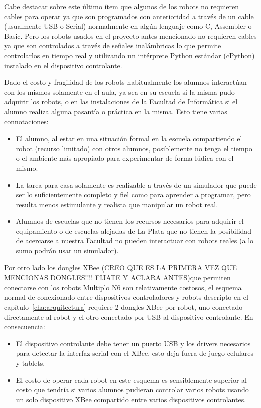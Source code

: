 Cabe destacar sobre este último ítem que algunos de los robots no requieren
cables para operar ya que son programados con anterioridad a través de un
cable (usualmente USB o Serial) normalmente en algún lenguaje como C, Assembler
o Basic. Pero los robots usados en el proyecto antes mencionado no requieren
cables ya que son controlados a través de señales
inalámbricas lo que permite controlarlos en tiempo real y utilizando
un intérprete Python estándar (cPython) instalado en el dispositivo
controlante.

Dado el costo y fragilidad de los robots habitualmente los alumnos interactúan
con los mismos solamente en el aula, ya sea en su escuela si la misma pudo
adquirir los robots, o en las instalaciones de la  Facultad de Informática si el alumno
realiza alguna pasantía o práctica en la misma. Esto tiene varias connotaciones:
\begin{itemize}
    \item El alumno, al estar en una situación formal en la escuela
        compartiendo el robot (recurso limitado) con otros
        alumnos, posiblemente no tenga el tiempo o el ambiente más apropiado
        para experimentar de forma lúdica con el mismo.
    \item La tarea para casa solamente es realizable a través de un simulador
        que puede ser lo suficientemente completo y fiel como para aprender
        a programar, pero resulta menos estimulante y realista que manipular
        un robot real.
    \item Alumnos de escuelas que no tienen los recursos necesarios para
        adquirir el equipamiento o de escuelas alejadas de La Plata que
        no tienen la posibilidad de acercarse a nuestra
        Facultad no pueden interactuar con robots reales
        (a lo sumo podrán usar un simulador).
\end{itemize}

Por otro lado los dongles XBee (CREO QUE ES LA PRIMERA VEZ QUE MENCIONAS DONGLES!!!! FIJATE Y ACLARA ANTES)que permiten conectarse con los robots
Multiplo N6
son relativamente costosos, el esquema normal de conexionado entre dispositivos
controladores y robots descripto en el capítulo~\ref{cha:arquitectura} requiere
2 dongles XBee por robot, uno conectado directamente al robot y el otro
conectado por USB al dispositivo controlante. En consecuencia:
\begin{itemize}
    \item El dispositivo controlante debe tener un puerto USB y los drivers
        necesarios para detectar la interfaz serial con el XBee, esto deja
        fuera de juego celulares y tablets.
    \item El costo de operar cada robot en este esquema es sensiblemente
        superior al costo que tendría si varios alumnos pudieran
        controlar varios robots usando un solo dispositivo XBee compartido
        entre varios dispositivos controlantes.
\end{itemize}


